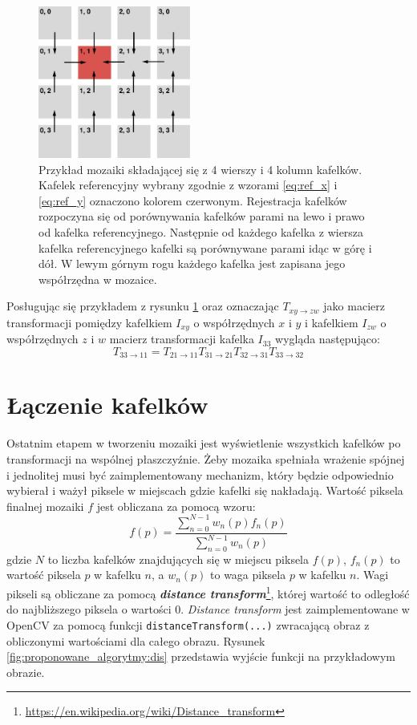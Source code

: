 \begin{figure}[htb]
  \centering
  \includegraphics[width=5cm]{gfx/global_registration}
  \caption{Przykład mozaiki składającej się z 4 wierszy i 4 kolumn kafelków. Kafelek referencyjny wybrany zgodnie z wzorami \ref{eq:ref_x} i \ref{eq:ref_y} oznaczono kolorem czerwonym. Rejestracja kafelków rozpoczyna się od porównywania kafelków parami na lewo i prawo od kafelka referencyjnego. Następnie od każdego kafelka z wiersza kafelka referencyjnego kafelki są porównywane parami idąc w górę i dół. W lewym górnym rogu każdego kafelka jest zapisana jego współrzędna w mozaice.}
  \label{fig:proponowane_algorytmy:global_registration}
\end{figure}

Posługując się przykładem z rysunku \ref{fig:proponowane_algorytmy:global_registration} oraz oznaczając $T_{xy\rightarrow zw}$ jako macierz transformacji pomiędzy kafelkiem $I_{xy}$ o współrzędnych $x$ i $y$ i kafelkiem $I_{zw}$ o współrzędnych $z$ i $w$ macierz transformacji kafelka $I_{33}$ wygląda następująco:
\begin{equation}
T_{33\rightarrow 11} = T_{21\rightarrow 11}T_{31\rightarrow 21}T_{32\rightarrow 31}T_{33\rightarrow 32}
\end{equation}
\section{Łączenie kafelków}
\label{sec:proponowane_algorytmy:laczenie_kafelkow}

Ostatnim etapem w tworzeniu mozaiki jest wyświetlenie wszystkich kafelków po transformacji na wspólnej płaszczyźnie. Żeby mozaika spełniała wrażenie spójnej i jednolitej musi być zaimplementowany mechanizm, który będzie odpowiednio wybierał i ważył piksele w miejscach gdzie kafelki się nakładają. Wartość piksela finalnej mozaiki $f$ jest obliczana za pomocą wzoru:
\begin{equation}
f(p) = \frac{\sum_{n = 0}^{N - 1} w_n(p)f_n(p)}{\sum_{n = 0}^{N - 1} w_n(p)}
\end{equation}
gdzie $N$ to liczba kafelków znajdujących się w miejscu piksela $f(p)$, $f_n(p)$ to wartość piksela $p$ w kafelku $n$, a $w_n(p)$ to waga piksela $p$ w kafelku $n$. Wagi pikseli są obliczane za pomocą \textbf{\textit{distance transform}}\footnote{\url{https://en.wikipedia.org/wiki/Distance_transform}}, której wartość to odległość do najbliższego piksela o wartości 0. \textit{Distance transform} jest zaimplementowane w OpenCV za pomocą funkcji \texttt{distanceTransform(...)} zwracającą obraz z obliczonymi wartościami dla całego obrazu. Rysunek \ref{fig:proponowane_algorytmy:dis} przedstawia wyjście funkcji na przykładowym obrazie.

